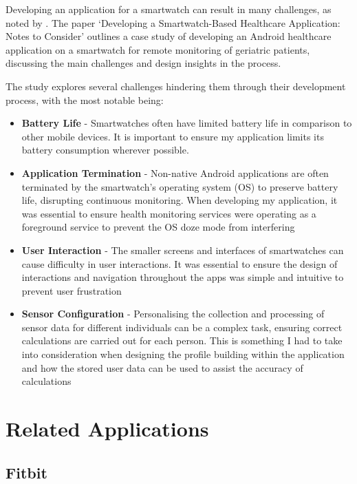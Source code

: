 \documentclass{l4proj}
\begin{document}
Developing an application for a smartwatch can result in many challenges, as noted by \cite{RamezaniDevelopingWatch}. The paper ‘Developing a Smartwatch-Based Healthcare Application: Notes to Consider’ outlines a case study of developing an Android healthcare application on a smartwatch for remote monitoring of geriatric patients, discussing the main challenges and design insights in the process.

The study explores several challenges hindering them through their development process, with the most notable being:

\begin{itemize}
    \item \textbf{Battery Life} - Smartwatches often have limited battery life in comparison to other mobile devices. It is important to ensure my application limits its battery consumption wherever possible.
    \item \textbf{Application Termination} - Non-native Android applications are often terminated by the smartwatch’s operating system (OS) to preserve battery life, disrupting continuous monitoring. When developing my application, it was essential to ensure health monitoring services were operating as a foreground service to prevent the OS doze mode from interfering
    \item \textbf{User Interaction} - The smaller screens and interfaces of smartwatches can cause difficulty in user interactions. It was essential to ensure the design of interactions and navigation throughout the apps was simple and intuitive to prevent user frustration
    \item \textbf{Sensor Configuration} - Personalising the collection and processing of sensor data for different individuals can be a complex task, ensuring correct calculations are carried out for each person. This is something I had to take into consideration when designing the profile building within the application and how the stored user data can be used to assist the accuracy of calculations
\end{itemize}


\section{Related Applications}
\label{sec:relatedapps}

\subsection{Fitbit}
\label{sec:fitbit}
\end{document}
